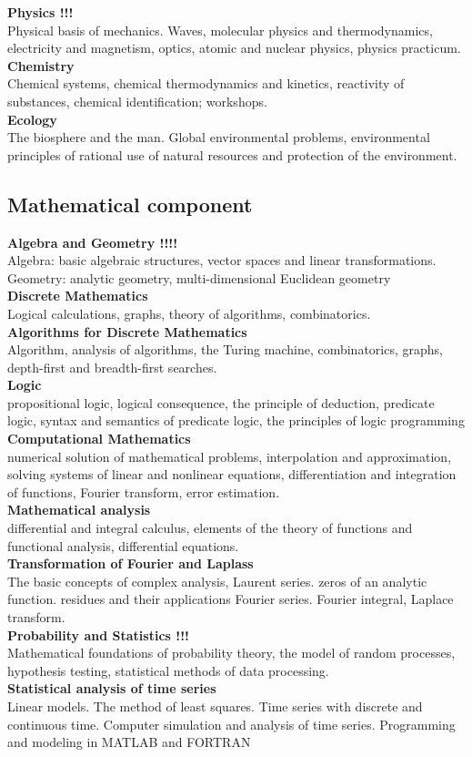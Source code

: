 \documentclass[a4paper, 12pt]{article}
\newcommand{\group}[1] {\subsection{#1}}
\newcommand{\discipline}[1] {\textbf{#1} \\ }
\newcommand{\desc}[1] { #1 \\ }
\begin{document}
\discipline{Physics !!!}
\desc{Physical basis of mechanics. Waves, molecular physics and thermodynamics, electricity and magnetism, optics, atomic and nuclear physics, physics practicum.}

\discipline{Chemistry}
\desc{Chemical systems, chemical thermodynamics and kinetics, reactivity of substances, chemical identification; workshops.}

\discipline{Ecology}
\desc{The biosphere and the man. Global environmental problems, environmental principles of rational use of natural resources and protection of the environment.}

\group{Mathematical component}

\discipline{Algebra and Geometry !!!!}
\desc{Algebra: basic algebraic structures, vector spaces and linear transformations.
Geometry: analytic geometry, multi-dimensional Euclidean geometry}


\discipline{Discrete Mathematics}
\desc{Logical calculations, graphs, theory of algorithms, combinatorics.}

\discipline{Algorithms for Discrete Mathematics}
\desc{Algorithm, analysis of algorithms, the Turing machine, combinatorics, graphs, depth-first and breadth-first searches.}

\discipline{Logic}
\desc{propositional logic, logical consequence, the principle of deduction, predicate logic, syntax and semantics of predicate logic, the principles of logic programming}

\discipline{Computational Mathematics}
\desc{numerical solution of mathematical problems, interpolation and approximation, solving systems of linear and nonlinear equations, differentiation and integration of functions, Fourier transform, error estimation.}

\discipline{Mathematical analysis}
\desc{differential and integral calculus, elements of the theory of functions and functional analysis, differential equations.}

\discipline{Transformation of Fourier and Laplass}
\desc{The basic concepts of complex analysis, Laurent series. zeros of an analytic function. residues and their applications Fourier series. Fourier integral, Laplace transform.}

\discipline{Probability and Statistics !!!}
\desc{Mathematical foundations of probability theory, the model of random processes, hypothesis testing, statistical methods of data processing.}

\discipline{Statistical analysis of time series}
\desc{Linear models. The method of least squares. Time series with discrete and continuous time. Computer simulation and analysis of time series. Programming and modeling in MATLAB and FORTRAN}
\end{document}
